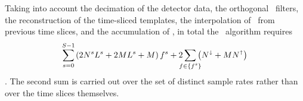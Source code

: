 Taking into account the decimation of the detector data, the orthogonal \fir\ filters, the reconstruction of the time-sliced templates, the interpolation of \SNR\ from previous time slices, and the accumulation of \SNR, in total the \lloid\ algorithm requires
$$
\sum_{\mathclap{s=0}}^{\mathclap{S-1}} \left( 2 \slicessamps \numsvdtmps + 2 \numtmps \numsvdtmps + \numtmps \right) f^s + 2\sum_{\mathclap{f \in \{f^s\}}} \left( N^\shortdownarrow + \numtmps N^\shortuparrow \right)
$$
\flops.  The second sum is carried out over the set of distinct sample rates rather than over the time slices themselves.

